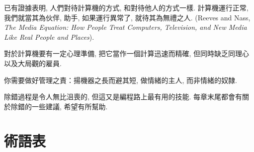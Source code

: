 \documentclass[10pt]{book}
\begin{document}
已有證據表明, 人們對待計算機的方式, 和對待他人的方式一樣. 
計算機運行正常, 我們就當其為伙伴, 助手, 如果運行異常了, 就待其為無禮之人. 
 (Reeves and Nass, {\it The Media
 Equation: How People Treat Computers, Television, and New Media
 Like Real People and Places}).

對於計算機要有一定心理準備, 把它當作一個計算迅速而精確, 
但同時缺乏同理心以及大局觀的雇員. 

你需要做好管理之責：揚機器之長而避其短, 做情緒的主人, 而非情緒的奴隸. 

除錯過程是令人無比沮喪的, 但這又是編程路上最有用的技能. 
每章末尾都會有關於除錯的一些建議, 希望有所幫助. 


\section{術語表}
\end{document}
